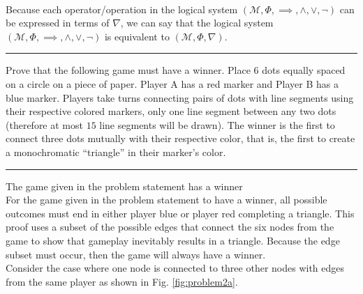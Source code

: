 \documentclass{article}
\begin{document}
\\[0.1in] Because each operator/operation in the logical system $(\mathcal{M}, \Phi, \implies, \wedge, \vee, \neg)$ can be expressed in terms of $\nabla$, we can say that the logical system $(\mathcal{M}, \Phi, \implies, \wedge, \vee, \neg)$ is equivalent to $(\mathcal{M}, \Phi, \nabla)$.
\\[0.05in] \noindent\rule{\textwidth}{0.4pt}\vspace{0.05in}
Prove that the following game must have a winner.  Place $6$ dots equally spaced on a circle on a piece of paper.
Player A has a red marker and Player B has a blue marker.
Players take turns connecting pairs of dots with line segments using their respective colored markers,
only one line segment between any two dots (therefore at most $15$ line segments will be drawn).
The winner is the first to connect three dots mutually with their respective color, that is, the first to create a monochromatic ``triangle''
in their marker's color.
\noindent\rule{\textwidth}{0.4pt}\vspace{0.05in}
 The game given in the problem statement has a winner
\\[0.05in] For the game given in the problem statement to have a winner, all possible outcomes must end in either player blue or player red completing a triangle. This proof uses a subset of the possible edges that connect the six nodes from the game to show that gameplay inevitably results in a triangle. Because the edge subset must occur, then the game will always have a winner. 
\\[0.05in]  Consider the case where one node is connected to three other nodes with edges from the same player as shown in Fig. \ref{fig:problem2a}.
\end{document}
